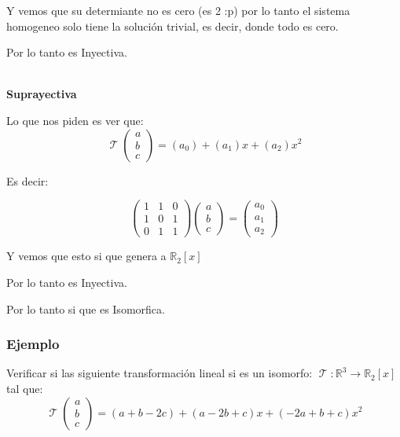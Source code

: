 \documentclass[12pt]{report}                                %
\DeclareMathOperator \LinealTransformation {\mathcal{T}}
\begin{document}
            Y vemos que su determiante no es cero (es 2 :p) por lo tanto el sistema homogeneo solo
            tiene la solución trivial, es decir, donde todo es cero.

            Por lo tanto es Inyectiva.

            \textbf{\\Suprayectiva}

            Lo que nos piden es ver que:
            \begin{equation*}
                \LinealTransformation(\begin{matrix}a\\b\\c\end{matrix}) = (a_0) +(a_1)x+(a_2)x^2
            \end{equation*}

            Es decir:

            \begin{equation*}
                \begin{pmatrix}1&1&0\\1&0&1\\0&1&1\end{pmatrix}
                \begin{pmatrix}a\\b\\c\end{pmatrix}
                =
                \begin{pmatrix}a_0\\a_1\\a_2\end{pmatrix}
            \end{equation*}

            Y vemos que esto si que genera a $\mathbb{R}_2[x]$

            Por lo tanto es Inyectiva.  

            Por lo tanto si que es Isomorfica.   


            \clearpage
            \subsubsection{Ejemplo}
            Verificar si las siguiente transformación lineal si es un isomorfo:
            $\LinealTransformation : \mathbb{R}^3 \to \mathbb{R}_2[x]$ tal que: 
            \begin{equation*}
                \LinealTransformation(\begin{matrix}a\\b\\c\end{matrix}) = (a+b-2c)+(a-2b+c)x+(-2a+b+c)x^2
            \end{equation*}
\end{document}
